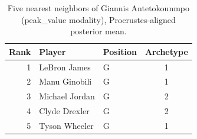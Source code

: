 \begin{table}[htbp]
  \centering\small
  \begin{tabular}{rllc}
    \toprule
    Rank & Player & Position & Archetype \\
    \midrule
    1 & LeBron James & G & 1 \\
    2 & Manu Ginobili & G & 1 \\
    3 & Michael Jordan & G & 2 \\
    4 & Clyde Drexler & G & 2 \\
    5 & Tyson Wheeler & G & 1 \\
    \bottomrule
  \end{tabular}
  \caption{Five nearest neighbors of Giannis Antetokounmpo (peak_value modality), Procrustes-aligned posterior mean.}
  \label{tab:Giannis_Antetokounmpo_neighbors_peak_value}
\end{table}


